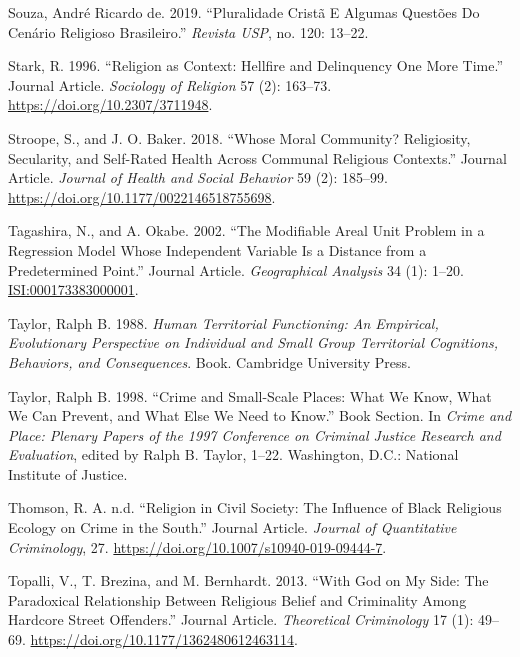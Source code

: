 \documentclass[smallextended]{svjour3}       %
\begin{document}
\leavevmode\hypertarget{ref-deSouza2019pluralidade}{}%
Souza, André Ricardo de. 2019. ``Pluralidade Cristã E Algumas Questões
Do Cenário Religioso Brasileiro.'' \emph{Revista USP}, no. 120: 13--22.

\leavevmode\hypertarget{ref-Stark1996religion}{}%
Stark, R. 1996. ``Religion as Context: Hellfire and Delinquency One More
Time.'' Journal Article. \emph{Sociology of Religion} 57 (2): 163--73.
\url{https://doi.org/10.2307/3711948}.

\leavevmode\hypertarget{ref-Stroope2018moral}{}%
Stroope, S., and J. O. Baker. 2018. ``Whose Moral Community?
Religiosity, Secularity, and Self-Rated Health Across Communal Religious
Contexts.'' Journal Article. \emph{Journal of Health and Social
Behavior} 59 (2): 185--99.
\url{https://doi.org/10.1177/0022146518755698}.

\leavevmode\hypertarget{ref-Tagashira2002modifiable}{}%
Tagashira, N., and A. Okabe. 2002. ``The Modifiable Areal Unit Problem
in a Regression Model Whose Independent Variable Is a Distance from a
Predetermined Point.'' Journal Article. \emph{Geographical Analysis} 34
(1): 1--20. \url{ISI:000173383000001}.

\leavevmode\hypertarget{ref-Taylor1988human}{}%
Taylor, Ralph B. 1988. \emph{Human Territorial Functioning: An
Empirical, Evolutionary Perspective on Individual and Small Group
Territorial Cognitions, Behaviors, and Consequences}. Book. Cambridge
University Press.

\leavevmode\hypertarget{ref-Taylor1998crime}{}%
Taylor, Ralph B. 1998. ``Crime and Small-Scale Places: What We Know,
What We Can Prevent, and What Else We Need to Know.'' Book Section. In
\emph{Crime and Place: Plenary Papers of the 1997 Conference on Criminal
Justice Research and Evaluation}, edited by Ralph B. Taylor, 1--22.
Washington, D.C.: National Institute of Justice.

\leavevmode\hypertarget{ref-Thomson2020religion}{}%
Thomson, R. A. n.d. ``Religion in Civil Society: The Influence of Black
Religious Ecology on Crime in the South.'' Journal Article.
\emph{Journal of Quantitative Criminology}, 27.
\url{https://doi.org/10.1007/s10940-019-09444-7}.

\leavevmode\hypertarget{ref-Topalli2013god}{}%
Topalli, V., T. Brezina, and M. Bernhardt. 2013. ``With God on My Side:
The Paradoxical Relationship Between Religious Belief and Criminality
Among Hardcore Street Offenders.'' Journal Article. \emph{Theoretical
Criminology} 17 (1): 49--69.
\url{https://doi.org/10.1177/1362480612463114}.
\end{document}
